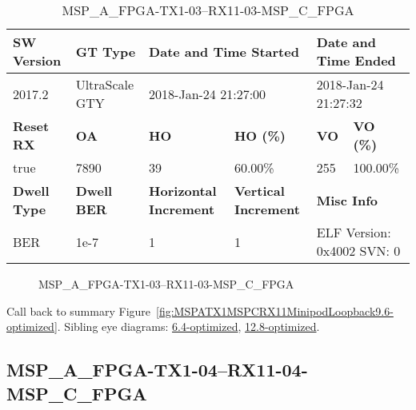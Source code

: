 \begin{table}[h]
\centering
\caption{MSP\_A\_FPGA-TX1-03--RX11-03-MSP\_C\_FPGA}
\label{tab:MSPAFPGATX103RX1103MSPCFPGA9.6-optimized}
\begin{tabular}{@{}|l|l|l|l|l|l|@{}}
\toprule
\textbf{SW Version}                & \textbf{GT Type}   & \multicolumn{2}{l|}{\textbf{Date and Time Started}}            & \multicolumn{2}{l|}{\textbf{Date and Time Ended}}        \\ \midrule
2017.2                       & UltraScale GTY          & \multicolumn{2}{l|}{2018-Jan-24 21:27:00}                   & \multicolumn{2}{l|}{2018-Jan-24 21:27:32}               \\ \midrule
\textbf{Reset RX}                  & \textbf{OA} & \textbf{HO}   & \textbf{HO (\%)} & \textbf{VO} & \textbf{VO (\%)} \\ \midrule
true & 7890        & 39          & 60.00\%        & 255        & 100.00\%       \\ \midrule
\textbf{Dwell Type}                & \textbf{Dwell BER} & \textbf{Horizontal Increment} & \textbf{Vertical Increment}    & \multicolumn{2}{l|}{\textbf{Misc Info}}                  \\ \midrule
BER                            & 1e-7        & 1        & 1           & \multicolumn{2}{l|}{ELF Version: 0x4002 SVN: 0}                         \\ \bottomrule
\end{tabular}
\end{table}

\begin{figure}[h]
\caption{MSP\_A\_FPGA-TX1-03--RX11-03-MSP\_C\_FPGA} \label{fig:MSPAFPGATX103RX1103MSPCFPGA9.6-optimized}
\end{figure}

Call back to summary Figure~\ref{fig:MSPATX1MSPCRX11MinipodLoopback9.6-optimized}.
Sibling eye diagrams: \hyperref[sec:MSPAFPGATX103RX1103MSPCFPGA6.4-optimized]{6.4-optimized}, \hyperref[sec:MSPAFPGATX103RX1103MSPCFPGA12.8-optimized]{12.8-optimized}.

\clearpage
\newpage


\subsection{MSP\_A\_FPGA-TX1-04--RX11-04-MSP\_C\_FPGA}\label{sec:MSPAFPGATX104RX1104MSPCFPGA9.6-optimized}

